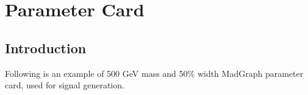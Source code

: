 \graphicspath{{chapt_dutch/}{intro/}{chapt2/}{chapt3/}{chapt4/}{chapt5/}{chapt6/}{chapt7/}}

\renewcommand\evenpagerightmark{{\scshape\small Appendix A}}
\renewcommand\oddpageleftmark{{\scshape\small MadGraph Parameter Card}}

\renewcommand{\bibname}{References}

\hyphenation{}

\chapter[MadGraph Parameter Card]%
{Parameter Card}
\section{Introduction}
Following is an example of 500 GeV mass and 50\% width MadGraph parameter card, used for signal generation.\\
